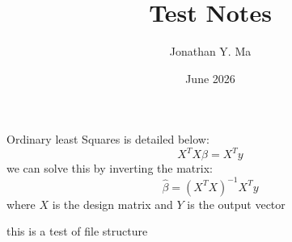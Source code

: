 \documentclass[11pt]{article}
\title{Test Notes}
\author{Jonathan Y. Ma}
\date{June 2026}
\begin{document}
\maketitle

Ordinary least Squares is detailed below:
\[ X^TX\beta = X^Ty\]
we can solve this by inverting the matrix:
\[\hat{\beta}=(X^T X)^{-1}X^Ty\]
where $X$ is the design matrix and $Y$ is the output vector


this is a test of file structure
\end{document}
